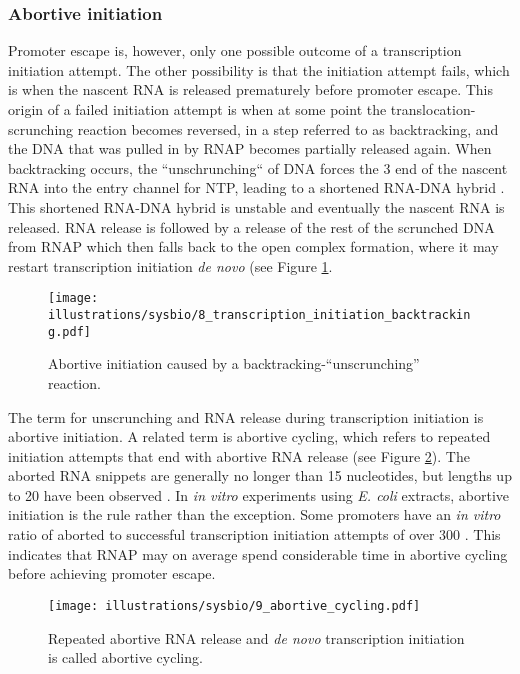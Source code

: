 \subsubsection{Abortive initiation}
Promoter escape is, however, only one possible outcome of a transcription
initiation attempt. The other possibility is that the initiation attempt fails,
which is when the nascent RNA is released prematurely before promoter escape.
This origin of a failed initiation attempt is when at some point the
translocation-scrunching reaction becomes reversed, in a step referred to as
backtracking, and the DNA that was pulled in by RNAP becomes partially released
again. When backtracking occurs, the ``unschrunching`` of DNA forces the 3\ppp
end of the nascent RNA into the entry channel for NTP, leading to a shortened
RNA-DNA hybrid \cite{hsu_initial_2006}. This shortened RNA-DNA hybrid is
unstable and eventually the nascent RNA is released. RNA release is followed by
a release of the rest of the scrunched DNA from RNAP which then falls back to
the open complex formation, where it may restart transcription initiation
\textit{de novo} \cite{lilian_m_promoter_2002} (see Figure
\ref{fig:abortive_backtrack}.

\begin{figure}[htb]
	\begin{center}
		\texttt{[image: illustrations/sysbio/8\_transcription\_initiation\_backtracking.pdf]}
	\end{center}
	\caption{Abortive initiation caused by a backtracking-``unscrunching''
	reaction.}
	\label{fig:abortive_backtrack}
\end{figure}

The term for unscrunching and RNA release during transcription initiation is
abortive initiation. A related term is abortive cycling, which refers to
repeated initiation attempts that end with abortive RNA release (see Figure
\ref{fig:abortive_cycling}). The aborted RNA snippets are generally no longer
than 15 nucleotides, but lengths up to 20 have been observed
\cite{chander_alternate_2007}. In \textit{in vitro} experiments using
\textit{E. coli} extracts, abortive initiation is the rule rather than the
exception. Some promoters have an \textit{in vitro} ratio of aborted to
successful transcription initiation attempts of over 300
\cite{hsu_initial_2006}. This indicates that RNAP may on average spend
considerable time in abortive cycling before achieving promoter escape.

\begin{figure}[htb]
	\begin{center}
		\texttt{[image: illustrations/sysbio/9\_abortive\_cycling.pdf]}
	\end{center}
	\caption{Repeated abortive RNA release and \textit{de novo} transcription
	initiation is called abortive cycling.}
	\label{fig:abortive_cycling}
\end{figure}

